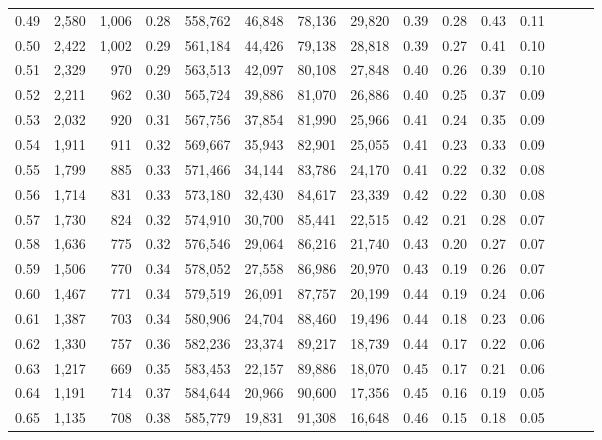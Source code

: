 \begin{tabular}{rrrrrrrrrrrrrrr}
0.49 &   2,580 &  1,006 &  0.28 &  558,762 &   46,848 &   78,136 &   29,820 &  0.39 &  0.28 &  0.43 &      0.11 \\
0.50 &   2,422 &  1,002 &  0.29 &  561,184 &   44,426 &   79,138 &   28,818 &  0.39 &  0.27 &  0.41 &      0.10 \\
0.51 &   2,329 &    970 &  0.29 &  563,513 &   42,097 &   80,108 &   27,848 &  0.40 &  0.26 &  0.39 &      0.10 \\
0.52 &   2,211 &    962 &  0.30 &  565,724 &   39,886 &   81,070 &   26,886 &  0.40 &  0.25 &  0.37 &      0.09 \\
0.53 &   2,032 &    920 &  0.31 &  567,756 &   37,854 &   81,990 &   25,966 &  0.41 &  0.24 &  0.35 &      0.09 \\
0.54 &   1,911 &    911 &  0.32 &  569,667 &   35,943 &   82,901 &   25,055 &  0.41 &  0.23 &  0.33 &      0.09 \\
0.55 &   1,799 &    885 &  0.33 &  571,466 &   34,144 &   83,786 &   24,170 &  0.41 &  0.22 &  0.32 &      0.08 \\
0.56 &   1,714 &    831 &  0.33 &  573,180 &   32,430 &   84,617 &   23,339 &  0.42 &  0.22 &  0.30 &      0.08 \\
0.57 &   1,730 &    824 &  0.32 &  574,910 &   30,700 &   85,441 &   22,515 &  0.42 &  0.21 &  0.28 &      0.07 \\
0.58 &   1,636 &    775 &  0.32 &  576,546 &   29,064 &   86,216 &   21,740 &  0.43 &  0.20 &  0.27 &      0.07 \\
0.59 &   1,506 &    770 &  0.34 &  578,052 &   27,558 &   86,986 &   20,970 &  0.43 &  0.19 &  0.26 &      0.07 \\
0.60 &   1,467 &    771 &  0.34 &  579,519 &   26,091 &   87,757 &   20,199 &  0.44 &  0.19 &  0.24 &      0.06 \\
0.61 &   1,387 &    703 &  0.34 &  580,906 &   24,704 &   88,460 &   19,496 &  0.44 &  0.18 &  0.23 &      0.06 \\
0.62 &   1,330 &    757 &  0.36 &  582,236 &   23,374 &   89,217 &   18,739 &  0.44 &  0.17 &  0.22 &      0.06 \\
0.63 &   1,217 &    669 &  0.35 &  583,453 &   22,157 &   89,886 &   18,070 &  0.45 &  0.17 &  0.21 &      0.06 \\
0.64 &   1,191 &    714 &  0.37 &  584,644 &   20,966 &   90,600 &   17,356 &  0.45 &  0.16 &  0.19 &      0.05 \\
0.65 &   1,135 &    708 &  0.38 &  585,779 &   19,831 &   91,308 &   16,648 &  0.46 &  0.15 &  0.18 &      0.05 \\

\end{tabular}
